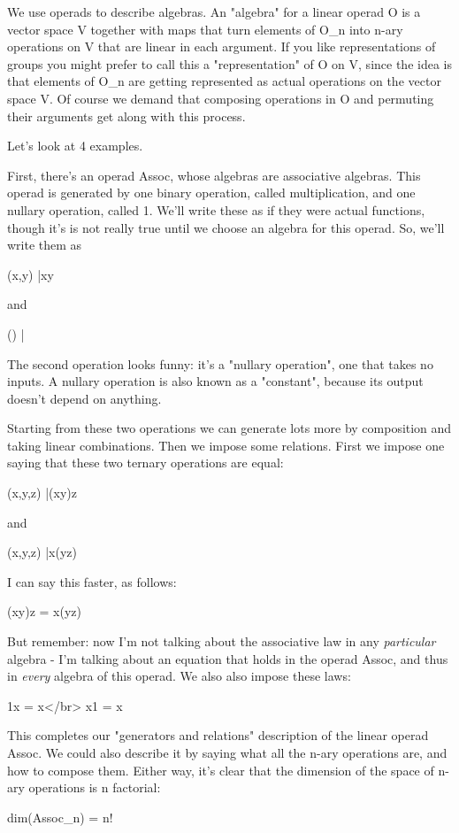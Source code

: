 We use operads to describe algebras.  An "algebra" for a
linear operad O is a vector space V together with maps that turn
elements of O_{n} into n-ary operations on V that are linear
in each argument.  If you like representations of groups you might
prefer to call this a "representation" of O on V, since the
idea is that elements of O_{n} are getting represented as
actual operations on the vector space V.  Of course we demand that
composing operations in O and permuting their arguments get along with
this process.

Let's look at 4 examples.

First, there's an operad Assoc, whose algebras are associative
algebras.  This operad is generated by one binary operation, called
multiplication, and one nullary operation, called 1.  We'll write
these as if they were actual functions, though it's is not really true
until we choose an algebra for this operad.  So, we'll write them as

(x,y) |\to  xy

and

() |

The second operation looks funny: it's a "nullary
operation", one that takes no inputs.  A nullary operation is
also known as a "constant", because its output doesn't
depend on anything.

Starting from these two operations we can generate lots more by
composition and taking linear combinations.  Then we impose some
relations.  First we impose one saying that these two ternary
operations are equal:

(x,y,z) |\to  (xy)z

and

(x,y,z) |\to  x(yz)

I can say this faster, as follows:

(xy)z = x(yz)

But remember: now I'm not talking about the associative law in any
\emph{particular} algebra - I'm talking about an equation that holds
in the operad Assoc, and thus in \emph{every} algebra of this operad.
We also also impose these laws:

1x = x</br>
x1 = x

This completes our "generators and relations" description of
the linear operad Assoc.  We could also describe it by saying what all
the n-ary operations are, and how to compose them.  Either way, it's
clear that the dimension of the space of n-ary operations is n
factorial:

dim(Assoc_{n}) = n!

